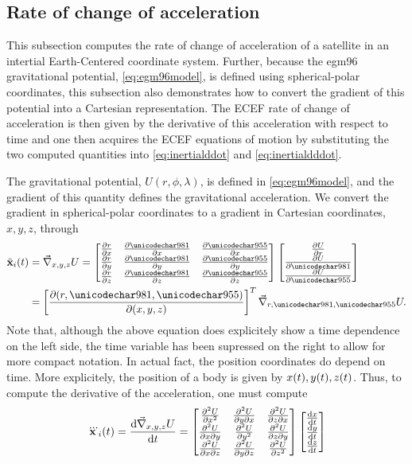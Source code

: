 \subsection{Rate of change of acceleration}
\label{an:rateacc}
This subsection computes the rate of change of acceleration of a satellite in an intertial Earth-Centered coordinate system. Further, because the egm96 gravitational potential, \eqref{eq:egm96model}, is defined using spherical-polar coordinates, this subsection also demonstrates how to convert the gradient of this potential into a Cartesian representation. The ECEF rate of change of acceleration is then given by the derivative of this acceleration with respect to time and one then acquires the ECEF equations of motion by substituting the two computed quantities into \eqref{eq:inertialddot} and \eqref{eq:inertialdddot}.
\par
The gravitational potential, $U(r,\phi,\lambda)$, is defined in \eqref{eq:egm96model}, and the gradient of this quantity defines the gravitational acceleration. We convert the gradient in spherical-polar coordinates to a gradient in Cartesian coordinates, $x,y,z$, through
\begin{equation}
\begin{split}
 \ddot{\vct{x}}_i(t) &= \del_{x,y,z}U = 
 \begin{bmatrix}
  \prt{r}{x} & \prt{\phi}{x} & \prt{\lambda}{x}\\
  \prt{r}{y} & \prt{\phi}{y} & \prt{\lambda}{y}\\
  \prt{r}{z} & \prt{\phi}{z} & \prt{\lambda}{z}
 \end{bmatrix}
 \begin{bmatrix}
  \prt{U}{r}\\
  \prt{U}{\phi}\\
  \prt{U}{\lambda}
 \end{bmatrix}\\
 &= \left[\prt{(r,\phi,\lambda)}{(x,y,z)}\right]^T\del_{r,\phi,\lambda}U.
 \end{split}
\end{equation}
Note that, although the above equation does explicitely show a time dependence on the left side, the time variable has been supressed on the right to allow for more compact notation. In actual fact, the position coordinates do depend on time. More explicitely, the position of a body is given by $x(t), y(t), z(t)$. Thus, to compute the derivative of the acceleration, one must compute
\begin{equation}
 \dddot{\mathbf{x}}_i(t) = \frac{\text{d}\vec{\nabla}_{x,y,z}U}{\text{d}t} = 
 \begin{bmatrix}
 \frac{\partial^2U}{\partial x^2} & \frac{\partial^2U}{\partial y\partial x} & \frac{\partial^2U}{\partial z\partial x}\\
 \frac{\partial^2U}{\partial x\partial y} & \frac{\partial^2U}{\partial y^2} & \frac{\partial^2U}{\partial z\partial y}\\
 \frac{\partial^2U}{\partial x\partial z} & \frac{\partial^2U}{\partial y\partial z} & \frac{\partial^2U}{\partial z^2}
 \end{bmatrix}
 \begin{bmatrix}
 \frac{\text{d}x}{\text{d}t} \\ \frac{\text{d}y}{\text{d}t} \\ \frac{\text{d}z}{\text{d}t}  
 \end{bmatrix}
\end{equation}
